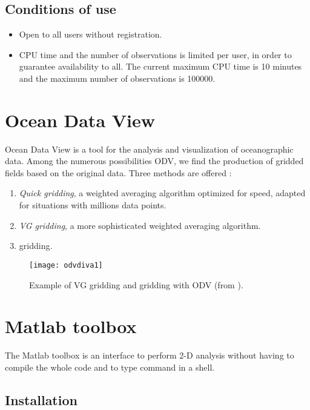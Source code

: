 \subsection{Conditions of use}


\begin{itemize}
\item Open to all users without registration.
\item CPU time and the number of observations is limited per user, in order to guarantee availability to all. The current maximum CPU time is 10 minutes and the maximum number of observations is 100000.
\end{itemize}


\section{Ocean Data View}

Ocean Data View \citep[ODV,][]{SCHLITZER02} is a tool for the analysis and visualization of oceanographic data. Among the numerous possibilities ODV, we find the production of gridded fields based on the original data. Three methods are offered \citep{SCHLITZER12}: 
\begin{enumerate}
\item \textit{Quick gridding}, a weighted averaging algorithm optimized for speed, adapted for situations with millions data points.
\item \textit{VG gridding}, a more sophisticated weighted averaging algorithm.
\item \diva gridding.
\end{enumerate}

\begin{figure}[H]
\centering 
\texttt{[image: odvdiva1]}
\caption{Example of VG gridding and \diva gridding with ODV (from \citet{SCHLITZER12}).\label{fig:divaodv}}
\end{figure}

\section{Matlab toolbox}

The \diva Matlab toolbox is an interface to perform 2-D analysis without having to compile the whole code and to type command in a shell. 

\subsection{Installation}

